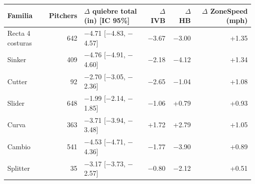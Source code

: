 \begin{tabular}{lrlrrr}
\toprule
Familia & Pitchers & $\Delta$ quiebre total (in) [IC 95\%] & $\Delta$ IVB & $\Delta$ HB & $\Delta$ ZoneSpeed (mph) \\
\midrule
Recta 4 costuras & 642 & \ensuremath{-}4.71 [\ensuremath{-}4.83, \ensuremath{-}4.57] & \ensuremath{-}3.67 & \ensuremath{-}3.00 & +1.35 \\
Sinker & 409 & \ensuremath{-}4.76 [\ensuremath{-}4.91, \ensuremath{-}4.60] & \ensuremath{-}2.18 & \ensuremath{-}4.12 & +1.34 \\
Cutter & 92 & \ensuremath{-}2.70 [\ensuremath{-}3.05, \ensuremath{-}2.36] & \ensuremath{-}2.65 & \ensuremath{-}1.04 & +1.08 \\
Slider & 648 & \ensuremath{-}1.99 [\ensuremath{-}2.14, \ensuremath{-}1.85] & \ensuremath{-}1.06 & +0.79 & +0.93 \\
Curva & 363 & \ensuremath{-}3.71 [\ensuremath{-}3.94, \ensuremath{-}3.48] & +1.72 & +2.79 & +1.05 \\
Cambio & 541 & \ensuremath{-}4.53 [\ensuremath{-}4.71, \ensuremath{-}4.36] & \ensuremath{-}1.77 & \ensuremath{-}3.90 & +0.89 \\
Splitter & 35 & \ensuremath{-}3.17 [\ensuremath{-}3.73, \ensuremath{-}2.57] & \ensuremath{-}0.80 & \ensuremath{-}2.12 & +0.51 \\
\bottomrule
\end{tabular}
